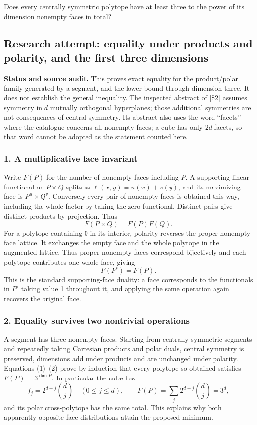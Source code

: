 \documentclass[11pt,a4paper]{article}
\begin{document}
Does every centrally symmetric polytope have at least three to the power of its dimension nonempty faces in total?

\subsection{Research attempt: equality under products and polarity, and the first three dimensions}
\textbf{Status and source audit.} This proves exact equality for the product/polar family generated by a segment, and the lower bound through dimension three. It does not establish the general inequality. The inspected abstract of [S2] assumes symmetry in $d$ mutually orthogonal hyperplanes; those additional symmetries are not consequences of central symmetry. Its abstract also uses the word ``facets'' where the catalogue concerns all nonempty faces; a cube has only $2d$ facets, so that word cannot be adopted as the statement counted here.

\subsubsection{1. A multiplicative face invariant}
Write $F(P)$ for the number of nonempty faces including $P$. A supporting linear functional on $P\times Q$ splits as $\ell(x,y)=u(x)+v(y)$, and its maximizing face is $P^u\times Q^v$. Conversely every pair of nonempty faces is obtained this way, including the whole factor by taking the zero functional. Distinct pairs give distinct products by projection. Thus
\[F(P\times Q)=F(P)F(Q).\tag{1}\]
For a polytope containing 0 in its interior, polarity reverses the proper nonempty face lattice. It exchanges the empty face and the whole polytope in the augmented lattice. Thus proper nonempty faces correspond bijectively and each polytope contributes one whole face, giving
\[F(P^\circ)=F(P).\tag{2}\]
This is the standard supporting-face duality: a face corresponds to the functionals in $P^\circ$ taking value 1 throughout it, and applying the same operation again recovers the original face.

\subsubsection{2. Equality survives two nontrivial operations}
A segment has three nonempty faces. Starting from centrally symmetric segments and repeatedly taking Cartesian products and polar duals, central symmetry is preserved, dimensions add under products and are unchanged under polarity. Equations (1)--(2) prove by induction that every polytope so obtained satisfies $F(P)=3^{\dim P}$. In particular the cube has
\[f_j=2^{d-j}\binom dj\quad(0\leq j\leq d),\qquad
F(P)=\sum_j2^{d-j}\binom dj=3^d,\]
and its polar cross-polytope has the same total. This explains why both apparently opposite face distributions attain the proposed minimum.
\end{document}
